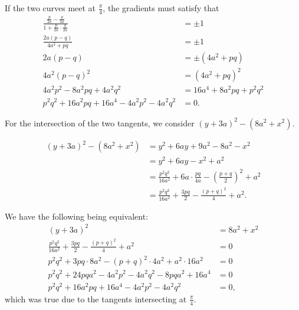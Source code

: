 \begin{enumerate}
          If the two curves meet at \(\frac{\pi}{4}\), the gradients must satisfy that
          \begin{align*}
              \frac{\frac{p}{2a} - \frac{q}{2a}}{1 + \frac{p}{2a} \cdot \frac{q}{2a}} & = \pm 1                       \\
              \frac{2a (p - q)}{4a^2 + pq}                                            & = \pm 1                       \\
              2a (p - q)                                                              & = \pm \left(4a^2 + pq\right)  \\
              4a^2 (p - q)^2                                                          & = (4a^2 + pq)^2               \\
              4a^2 p^2 - 8 a^2 pq + 4 a^2 q^2                                         & = 16 a^4 + 8 a^2 pq + p^2 q^2 \\
              p^2 q^2 + 16 a^2 pq + 16 a^4 - 4 a^2 p^2 - 4 a^2 q^2                    & = 0.
          \end{align*}

          For the intersection of the two tangents, we consider \((y + 3a)^2 - (8a^2 + x^2)\).

          \begin{align*}
              (y + 3a)^2 - (8a^2 + x^2) & = y^2 + 6ay + 9a^2 - 8a^2 - x^2                                                         \\
                                        & = y^2 + 6ay - x^2 + a^2                                                                 \\
                                        & = \frac{p^2 q^2}{16a^2} + 6a \cdot \frac{pq}{4a} - \left(\frac{p + q}{2}\right)^2 + a^2 \\
                                        & = \frac{p^2 q^2}{16a^2} + \frac{3pq}{2} - \frac{(p + q)^2}{4} + a^2.
          \end{align*}

          We have the following being equivalent:
          \begin{align*}
              (y + 3a)^2                                                         & = 8a^2 + x^2 \\
              \frac{p^2 q^2}{16 a^2} + \frac{3pq}{2} - \frac{(p + q)^2}{4} + a^2 & = 0          \\
              p^2 q^2 + 3pq \cdot 8a^2 - (p + q)^2 \cdot 4a^2 + a^2 \cdot 16 a^2 & = 0          \\
              p^2 q^2 + 24 pq a^2 - 4 a^2 p^2 - 4 a^2 q^2 - 8 pq a^2 + 16 a^4    & = 0          \\
              p^2 q^2 + 16 a^2 pq + 16 a^4 - 4 a^2 p^2 - 4 a^2 q^2               & = 0,
          \end{align*}
          which was true due to the tangents intersecting at \(\frac{\pi}{4}\).


\end{enumerate}
